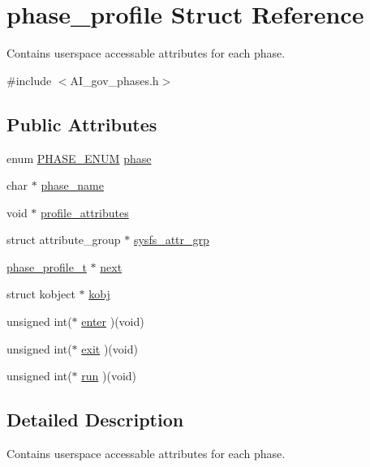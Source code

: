 \hypertarget{structphase__profile}{}\section{phase\+\_\+profile Struct Reference}
\label{structphase__profile}


Contains userspace accessable attributes for each phase.  




{\ttfamily \#include $<$A\+I\+\_\+gov\+\_\+phases.\+h$>$}

\subsection*{Public Attributes}
\begin{DoxyCompactItemize}
\item 
enum \hyperlink{AI__gov__phases_8h_a59664fef4d2987410ea13b917756d6ac}{P\+H\+A\+S\+E\+\_\+\+E\+N\+UM} \hyperlink{structphase__profile_a51cbd5f8e428ffd04e5a0feaf2f8caa9}{phase}
\item 
char $\ast$ \hyperlink{structphase__profile_a92a3f2bbc73f54e27255ad67660bcd89}{phase\+\_\+name}
\item 
void $\ast$ \hyperlink{structphase__profile_a0c77f4be0f8286275e0bf6583b1d5c20}{profile\+\_\+attributes}
\item 
struct attribute\+\_\+group $\ast$ \hyperlink{structphase__profile_a75fa703877db612110bead3a231685ee}{sysfs\+\_\+attr\+\_\+grp}
\item 
\hyperlink{AI__gov__phases_8h_a7512cecbb646499da7b0bec7c4155808}{phase\+\_\+profile\+\_\+t} $\ast$ \hyperlink{structphase__profile_a7ba32c8fdbf80efc580c6df57d0ec433}{next}
\item 
struct kobject $\ast$ \hyperlink{structphase__profile_ad75ce163887fd0964c147e23a155e7ab}{kobj}
\item 
unsigned int($\ast$ \hyperlink{structphase__profile_a53beff5bbbc84cbb5c3e5e1dd48593c1}{enter} )(void)
\item 
unsigned int($\ast$ \hyperlink{structphase__profile_a9c942d0c12f12afd5503ddd40498dd5d}{exit} )(void)
\item 
unsigned int($\ast$ \hyperlink{structphase__profile_ae6cf7a65756ec70cd7a50e3367af5eeb}{run} )(void)
\end{DoxyCompactItemize}


\subsection{Detailed Description}
Contains userspace accessable attributes for each phase. 

